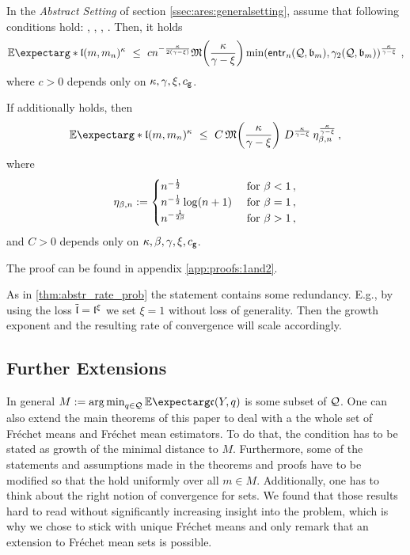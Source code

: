 \begin{theorem}\label{thm:abstr_rate_exp}
	In the \textit{Abstract Setting} of section \ref{ssec:ares:generalsetting}, assume that following conditions hold:
	, , , .
	Then, it holds
	\begin{equation*}
		\Ex*{\mf l(m ,m_n)^\kappa}
		\ \leq \ 
		c n^{-\frac{\kappa}{2(\gamma-\xi)}} \mf M\brOf{\frac{\kappa}{\gamma-\xi}} \min\brOf{\entrn(\mc Q, \mf b_m), \gamma_2(\mc Q, \mf b_m)}^{\frac{\kappa}{\gamma-\xi}}
		\eqcm
	\end{equation*}
	where $c>0$ depends only on $\kappa,\gamma,\xi,c_{\mathsf{g}}$.
	
	If additionally  holds, then
	\begin{equation*}
		\Ex*{\mf l(m ,m_n)^\kappa}
		\ \leq \
		C \, \mf M\brOf{\frac{\kappa}{\gamma-\xi}} \,  D^{\frac{\kappa}{\gamma-\xi}} \,  \eta_{\beta,n}^{\frac{\kappa}{\gamma-\xi}}
		\eqcm
	\end{equation*}
	where 
	\begin{equation*}
		\eta_{\beta,n} := 
		\begin{cases} 
			n^{-\frac12} & \text{ for }\beta < 1\, ,\\
			n^{-\frac12} \log(n+1) & \text{ for } \beta = 1\, ,\\
			n^{-\frac1{2\beta}} & \text{ for } \beta > 1\, ,
		\end{cases} 
	\end{equation*}
	and $C>0$ depends only on $\kappa,\beta,\gamma,\xi,c_{\mathsf{g}}$.
\end{theorem}
The proof can be found in appendix \autoref{app:proofs:1and2}.

As in \autoref{thm:abstr_rate_prob} the statement contains some redundancy. E.g., by using the loss $\tilde {\mathfrak{l}} = \mathfrak{l}^\xi$ we set $\xi=1$ without loss of generality. Then the growth exponent and the resulting rate of convergence will scale accordingly.
%
%
%
%
%
\subsection{Further Extensions}\label{ssec:ares:extensions}
%
In general $M := \argmin_{q\in\mc Q} \Ex{\mf c(Y, q)}$ is some subset of $\mathcal{Q}$. One can also extend the main theorems of this paper to deal with a the whole set of Fréchet means and Fréchet mean estimators. To do that, the  condition has to be stated as growth of the minimal distance to $M$. Furthermore, some of the statements and assumptions made in the theorems and proofs have to be modified so that the hold uniformly over all $m\in M$. Additionally, one has to think about the right notion of convergence for sets. We found that those results hard to read without significantly increasing insight into the problem, which is why we chose to stick with unique Fréchet means and only remark that an extension to Fréchet mean sets is possible.

